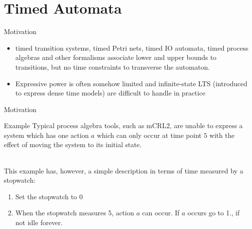 \documentclass{beamer}
\def\dgold#1{{\darkgoldenrod #1}}
\def\dkb#1{{\blue #1}}
\begin{document}

\section{Timed Automata}
\begin{slide}{Motivation}
\small

\begin{itemize}
\item \dgold{timed transition systems}, \dgold{timed Petri nets}, \dgold{timed IO automata}, \dgold{timed process algebras} and other formalisms associate lower and upper bounds to transitions, but no \dkb{time constraints} to transverse the automaton.
\item Expressive power is often somehow limited and \dgold{infinite}-state LTS (introduced to express \dkb{dense} time models) are 
difficult to handle in practice
\end{itemize}
\end{slide}


\begin{slide}{Motivation}
\small

\begin{block}{Example}
Typical process algebra tools, such as mCRL2, are unable to express a \dgold{system which has one action $a$ which can only occur at time point $5$
with the effect of moving the system to its initial state.}
\end{block}
~\\

This example has, however, a simple description in terms of time measured by a \dgold{stopwatch}:
\begin{enumerate}
\item Set the stopwatch to 0
\item When the stopwatch measures 5, action $a$ can occur. If $a$ occurs go to 1., if not idle forever.
\end{enumerate}

~\\
\end{slide}
\end{document}
